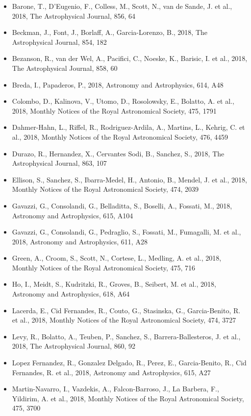 \documentclass{letter}
\begin{document}
\begin{enumerate}
\begin{itemize}
\item Barone, T., D'Eugenio, F., Colless, M., Scott, N., van de Sande, J. et al., 2018, The Astrophysical Journal, 856, 64
\item Beckman, J., Font, J., Borlaff, A., Garcia-Lorenzo, B., 2018, The Astrophysical Journal, 854, 182
\item Bezanson, R., van der Wel, A., Pacifici, C., Noeske, K., Barisic, I. et al., 2018, The Astrophysical Journal, 858, 60
\item Breda, I., Papaderos, P., 2018, Astronomy and Astrophysics, 614, A48
\item Colombo, D., Kalinova, V., Utomo, D., Rosolowsky, E., Bolatto, A. et al., 2018, Monthly Notices of the Royal Astronomical Society, 475, 1791
\item Dahmer-Hahn, L., Riffel, R., Rodriguez-Ardila, A., Martins, L., Kehrig, C. et al., 2018, Monthly Notices of the Royal Astronomical Society, 476, 4459
\item Durazo, R., Hernandez, X., Cervantes Sodi, B., Sanchez, S., 2018, The Astrophysical Journal, 863, 107
\item Ellison, S., Sanchez, S., Ibarra-Medel, H., Antonio, B., Mendel, J. et al., 2018, Monthly Notices of the Royal Astronomical Society, 474, 2039
\item Gavazzi, G., Consolandi, G., Belladitta, S., Boselli, A., Fossati, M., 2018, Astronomy and Astrophysics, 615, A104
\item Gavazzi, G., Consolandi, G., Pedraglio, S., Fossati, M., Fumagalli, M. et al., 2018, Astronomy and Astrophysics, 611, A28
\item Green, A., Croom, S., Scott, N., Cortese, L., Medling, A. et al., 2018, Monthly Notices of the Royal Astronomical Society, 475, 716
\item Ho, I., Meidt, S., Kudritzki, R., Groves, B., Seibert, M. et al., 2018, Astronomy and Astrophysics, 618, A64
\item Lacerda, E., Cid Fernandes, R., Couto, G., Stasinska, G., Garcia-Benito, R. et al., 2018, Monthly Notices of the Royal Astronomical Society, 474, 3727
\item Levy, R., Bolatto, A., Teuben, P., Sanchez, S., Barrera-Ballesteros, J. et al., 2018, The Astrophysical Journal, 860, 92
\item Lopez Fernandez, R., Gonzalez Delgado, R., Perez, E., Garcia-Benito, R., Cid Fernandes, R. et al., 2018, Astronomy and Astrophysics, 615, A27
\item Martin-Navarro, I., Vazdekis, A., Falcon-Barroso, J., La Barbera, F., Yildirim, A. et al., 2018, Monthly Notices of the Royal Astronomical Society, 475, 3700

\end{itemize}
\end{enumerate}
\end{document}
